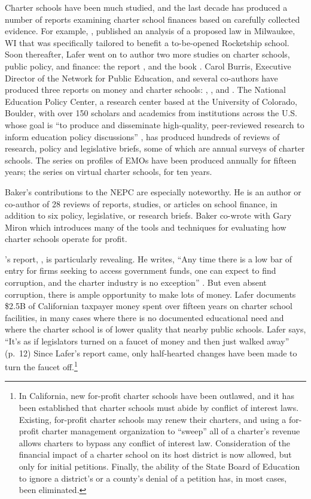 Charter schools have been much studied, and the last decade has produced a number of reports examining charter school finances based on carefully collected evidence. For example, \textcite{Lafer2014}, published an analysis of a proposed law in Milwaukee, WI \parencite{Lafer2014} that was specifically tailored to benefit a to-be-opened Rocketship school. Soon thereafter, Lafer went on to author two more studies on charter schools, public policy, and finance: the report  \parencite{Lafer2017a}, and the book  \parencite{Lafer2017b}. Carol Burris, Executive Director of the Network for Public Education, and several co-authors have produced three reports on money and charter schools: \textcite{Burris.Pfleger2020}, \textcite{Burris.Bryant2020}, and \textcite{Burris.Cimarusti2021}. The National Education Policy Center, a research center based at the University of Colorado, Boulder, with over 150 scholars and academics from institutions across the U.S. whose goal is ``to produce and disseminate high-quality, peer-reviewed research to inform education policy discussions'' \parencite{NEPC2021}, has produced hundreds of reviews of research, policy and legislative briefs, some of which are annual surveys of charter schools. The series on profiles of EMOs have been produced annually for fifteen years; the series on virtual charter schools, for ten years.

Baker's contributions to the NEPC are especially noteworthy. He is an author or co-author of 28 reviews of reports, studies, or articles on school finance, in addition to six policy, legislative, or research briefs. Baker co-wrote with Gary Miron  \parencite{Baker.Miron2015} which introduces many of the tools and techniques for evaluating how charter schools operate for profit.

\citeauthor{Lafer2017a}'s report, , is particularly revealing. He writes,
``Any time there is a low bar of entry for firms seeking to access government funds, one can expect to find corruption, and the charter industry is no exception'' \parencite[18]{Lafer2017a}. But even absent corruption, there is ample opportunity to make lots of money. Lafer documents \$2.5B of Californian taxpayer money spent over fifteen years on charter school facilities, in many cases where there is no documented educational need and where the charter school is of lower quality that nearby public schools. Lafer says, ``It's as if legislators turned on a faucet of money and then just walked away'' (p.~12) Since Lafer's report came, only half-hearted changes have been made to turn the faucet off.\footnote{In California, new for-profit charter schools have been outlawed, and it has been established that charter schools must abide by conflict of interest laws. Existing, for-profit charter schools may renew their charters, and using a for-profit charter management organization to ``sweep'' all of a charter's revenue allows charters to bypass any conflict of interest law. Consideration of the financial impact of a charter school on its host district is now allowed, but only for initial petitions. Finally, the ability of the State Board of Education to ignore a district's or a county's denial of a petition has, in most cases, been eliminated.}

